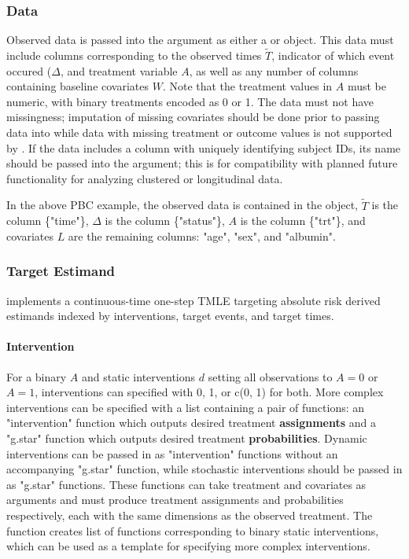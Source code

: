 \documentclass{report}
\newcommand{\1}{\ensuremath{\mathbf{1}}}
\newcommand{\T}{\ensuremath{\widetilde{T}}}
\renewcommand{\L}{\ensuremath{W}}
\begin{document}
\subsubsection{Data}
\label{ObservedDataConcrete}
Observed data is passed into the  argument as either a  or  object. This data must include columns corresponding to the observed times \(\T\), indicator of which event occured (\(\Delta\), and treatment variable \(A\), as well as any number of columns containing baseline covariates \(\L\). Note that the treatment values in \(A\) must be numeric, with binary treatments encoded as 0 or 1. The data must not have missingness; imputation of missing covariates should be done prior to passing data into  while data with missing treatment or outcome values is not supported by . If the data includes a column with uniquely identifying subject IDs, its name should be passed into the  argument; this is for compatibility with planned future functionality for analyzing clustered or longitudinal data.

In the above PBC example, the observed data is contained in the  object, \(\T\) is the column \{"time"\}, \(\Delta\) is the column \{"status"\}, \(A\) is the column \{"trt"\}, and covariates \(L\) are the remaining columns: "age", "sex", and "albumin".

\subsubsection{Target Estimand}
\label{Estimand}
 implements a continuous-time one-step TMLE targeting absolute risk derived estimands indexed by  interventions, target events, and target times.  

\paragraph{Intervention}
\label{TreatmentRegime}
For a binary \(A\) and static interventions \(d\) setting all observations to \(A=0\) or \(A=1\), interventions can specified with 0, 1, or c(0, 1) for both. More complex interventions can be specified with a list containing a pair of functions: an "intervention" function which outputs desired treatment \textbf{\textbf{assignments}} and a "g.star" function which outputs desired treatment \textbf{\textbf{probabilities}}. Dynamic interventions can be passed in as "intervention" functions without an accompanying "g.star" function, while stochastic interventions should be passed in as "g.star" functions. These functions can take treatment and covariates as arguments and must produce treatment assignments and probabilities respectively, each with the same dimensions as the observed treatment. The function  creates list of functions corresponding to binary static interventions, which can be used as a template for specifying more complex interventions.
\end{document}
